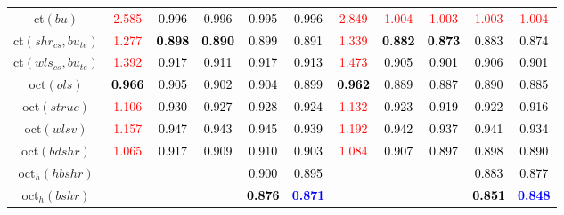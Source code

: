 \begin{tabular}[t]{c|>{}cccc>{}c|ccccc}
ct$(bu)$ & \textcolor{red}{2.585} & \textcolor{black}{0.996} & \textcolor{black}{0.996} & \textcolor{black}{0.995} & \textcolor{black}{0.996} & \textcolor{red}{2.849} & \textcolor{red}{1.004} & \textcolor{red}{1.003} & \textcolor{red}{1.003} & \textcolor{red}{1.004}\\
ct$(shr_{cs}, bu_{te})$ & \textcolor{red}{1.277} & \textcolor{black}{\textbf{0.898}} & \textcolor{black}{\textbf{0.890}} & \textcolor{black}{0.899} & \textcolor{black}{0.891} & \textcolor{red}{1.339} & \textcolor{black}{\textbf{0.882}} & \textcolor{black}{\textbf{0.873}} & \textcolor{black}{0.883} & \textcolor{black}{0.874}\\
ct$(wls_{cs}, bu_{te})$ & \textcolor{red}{1.392} & \textcolor{black}{0.917} & \textcolor{black}{0.911} & \textcolor{black}{0.917} & \textcolor{black}{0.913} & \textcolor{red}{1.473} & \textcolor{black}{0.905} & \textcolor{black}{0.901} & \textcolor{black}{0.906} & \textcolor{black}{0.901}\\
oct$(ols)$ & \textcolor{black}{\textbf{0.966}} & \textcolor{black}{0.905} & \textcolor{black}{0.902} & \textcolor{black}{0.904} & \textcolor{black}{0.899} & \textcolor{black}{\textbf{0.962}} & \textcolor{black}{0.889} & \textcolor{black}{0.887} & \textcolor{black}{0.890} & \textcolor{black}{0.885}\\
oct$(struc)$ & \textcolor{red}{1.106} & \textcolor{black}{0.930} & \textcolor{black}{0.927} & \textcolor{black}{0.928} & \textcolor{black}{0.924} & \textcolor{red}{1.132} & \textcolor{black}{0.923} & \textcolor{black}{0.919} & \textcolor{black}{0.922} & \textcolor{black}{0.916}\\
oct$(wlsv)$ & \textcolor{red}{1.157} & \textcolor{black}{0.947} & \textcolor{black}{0.943} & \textcolor{black}{0.945} & \textcolor{black}{0.939} & \textcolor{red}{1.192} & \textcolor{black}{0.942} & \textcolor{black}{0.937} & \textcolor{black}{0.941} & \textcolor{black}{0.934}\\
oct$(bdshr)$ & \textcolor{red}{1.065} & \textcolor{black}{0.917} & \textcolor{black}{0.909} & \textcolor{black}{0.910} & \textcolor{black}{0.903} & \textcolor{red}{1.084} & \textcolor{black}{0.907} & \textcolor{black}{0.897} & \textcolor{black}{0.898} & \textcolor{black}{0.890}\\
oct$_h(hbshr)$ &  &  &  & \textcolor{black}{0.900} & \textcolor{black}{0.895} &  &  &  & \textcolor{black}{0.883} & \textcolor{black}{0.877}\\
oct$_h(bshr)$ &  &  &  & \textcolor{black}{\textbf{0.876}} & \textcolor{blue}{\textbf{0.871}} &  &  &  & \textcolor{black}{\textbf{0.851}} & \textcolor{blue}{\textbf{0.848}}\\

\end{tabular}
